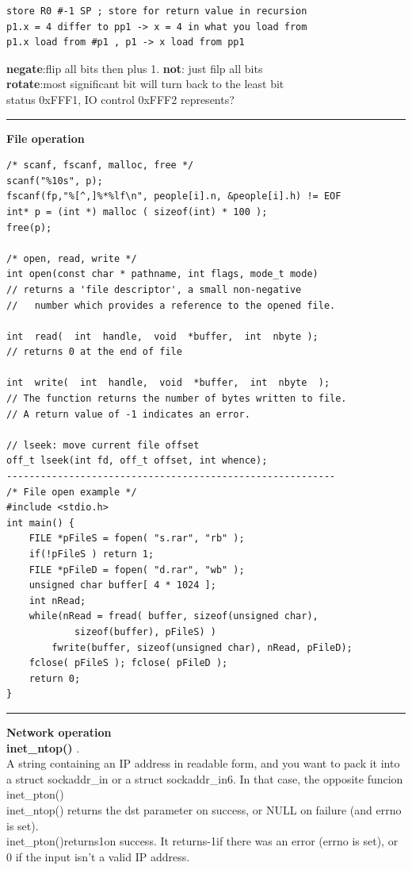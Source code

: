 \documentclass[8pt,a4paper,landscape]{article}
\newcommand{\topic}[1]{\textbf{\large #1}}
\begin{document}
\begin{spacing}{-1}
\begin{multicols*}{3}
\begin{verbatim}
store R0 #-1 SP ; store for return value in recursion
p1.x = 4 differ to pp1 -> x = 4 in what you load from
p1.x load from #p1 , p1 -> x load from pp1  \end{verbatim}
    \textbf{negate}:flip all bits then plus 1. \textbf{not}: just filp all bits \\
    \textbf{rotate}:most significant bit will turn back to the least bit \\
    status 0xFFF1, IO control 0xFFF2 represents? \\
\hrule \noindent
\topic{File operation}
\begin{verbatim}
/* scanf, fscanf, malloc, free */
scanf("%10s", p);
fscanf(fp,"%[^,]%*%lf\n", people[i].n, &people[i].h) != EOF 
int* p = (int *) malloc ( sizeof(int) * 100 );
free(p);

/* open, read, write */ 
int open(const char * pathname, int flags, mode_t mode)
// returns a 'file descriptor', a small non-negative 
//   number which provides a reference to the opened file.

int  read(  int  handle,  void  *buffer,  int  nbyte ); 
// returns 0 at the end of file

int  write(  int  handle,  void  *buffer,  int  nbyte  );
// The function returns the number of bytes written to file.
// A return value of -1 indicates an error.

// lseek: move current file offset 
off_t lseek(int fd, off_t offset, int whence);
----------------------------------------------------------
/* File open example */
#include <stdio.h> 
int main() { 
    FILE *pFileS = fopen( "s.rar", "rb" );
    if(!pFileS ) return 1; 
    FILE *pFileD = fopen( "d.rar", "wb" ); 
    unsigned char buffer[ 4 * 1024 ];
    int nRead;
    while(nRead = fread( buffer, sizeof(unsigned char),
            sizeof(buffer), pFileS) ) 
        fwrite(buffer, sizeof(unsigned char), nRead, pFileD); 
    fclose( pFileS ); fclose( pFileD );
    return 0;
}
\end{verbatim}
\hrule \noindent
\topic{Network operation} \\
\textbf{inet\_ntop()} . \\
A string containing an IP address in readable form, and you want to pack it into a struct sockaddr\_in or a struct sockaddr\_in6. In that case, the opposite funcion inet\_pton() \\
inet\_ntop() returns the dst parameter on success, or NULL on failure (and errno is set). \\
inet\_pton()returns1on success. It returns-1if there was an error (errno is set), or 0 if the input isn't a valid IP address. \\


\end{multicols*}
\end{spacing}
\end{document}
